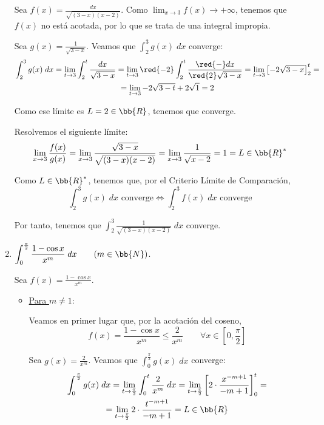 \begin{ejercicio}
\begin{enumerate}
    Sea $\displaystyle f(x)=\frac{dx}{\sqrt{(3-x)(x-2)}}$. Como $\displaystyle \lim_{x\to 3}f(x)\to +\infty$, tenemos que $f(x)$ no está acotada, por lo que se trata de una integral impropia.

    Sea $g(x)=\frac{1}{\sqrt{3-x}}$. Veamos que $\int_2^3 g(x)\;dx$ converge:
    \begin{multline*}
        \int_2^3 g(x)\;dx
        = \lim_{t\to 3} \int_2^t \frac{dx}{\sqrt{3-x}}
        = \lim_{t\to 3} \red{-2}\int_2^t \frac{\red{-}dx}{\red{2}\sqrt{3-x}}
        = \lim_{t\to 3} \left[-2\sqrt{3-x}\right]_2^t 
        =\\=
        \lim_{t\to 3} -2\sqrt{3-t} +2\sqrt{1} = 2
    \end{multline*}

    Como ese límite es $L=2\in \bb{R}$, tenemos que converge.

    Resolvemos el siguiente límite:
    \begin{equation*}
        \lim_{x\to 3} \frac{f(x)}{g(x)} = \lim_{x\to 3}\frac{\sqrt{3-x}}{\sqrt{(3-x)(x-2)}}
        = \lim_{x\to 3}\frac{1}{\sqrt{x-2}} = 1 = L\in \bb{R}^\ast
    \end{equation*}

    Como $L\in \bb{R}^\ast$, tenemos que, por el Criterio Límite de Comparación,
    \begin{equation*}
        \int_2^3 g(x)\;dx \text{ converge} \Longleftrightarrow 
        \int_2^3 f(x)\;dx \text{ converge}
    \end{equation*}

    Por tanto, tenemos que  $\displaystyle \int_2^3 \frac{1}{\sqrt{(3-x)(x-2)}}\;dx$ converge.



    \item $\displaystyle \int_0^{\frac{\pi}{2}} \frac{1-\cos x}{x^m} \;dx\qquad (m\in \bb{N})$.

    Sea $\displaystyle f(x)=\frac{1-\cos x}{x^m}$.
    
    
    \begin{itemize}
        \item \underline{Para $m\neq 1$}:

        Veamos en primer lugar que, por la acotación del coseno,
    \begin{equation*}
        f(x)=\frac{1-\cos x}{x^m} \leq \frac{2}{x^m} \qquad \forall x\in \left[0,\frac{\pi}{2}\right]
    \end{equation*}

    Sea $g(x)=\frac{2}{x^m}$. Veamos que $\int_0^{\frac{\pi}{2}} g(x)\;dx$ converge:
    \begin{multline*}
        \int_0^{\frac{\pi}{2}} g(x)\;dx
        = \lim_{t\to \frac{\pi}{2}} \int_0^t \frac{2}{x^m}\;dx
        = \lim_{t\to \frac{\pi}{2}} \left[2\cdot \frac{x^{-m+1}}{-m+1}\right]_0^t 
        =\\=
        \lim_{t\to \frac{\pi}{2}} 2\cdot \frac{t^{-m+1}}{-m+1} = L\in \bb{R}
    \end{multline*}


\end{itemize}
\end{enumerate}
\end{ejercicio}
